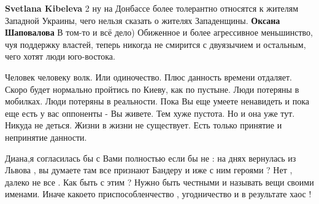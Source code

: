 \begin{itemize}
\begin{itemize}
\textbf{Svetlana Kibeleva} 2 ну на Донбассе более толерантно относятся к
жителям Западной Украины, чего нельзя сказать о жителях Западенщины.
\textbf{Оксана Шаповалова}
В том-то и всё дело)
Обиженное и более агрессивное меньшинство, чуя поддержку властей, теперь никогда не смирится с двуязычием и остальным, чего хотят люди юго-востока.
\end{itemize}
 
Человек человеку волк. Или одиночество. Плюс данность времени отдаляет. Скоро
будет нормально пройтись по Киеву, как по пустыне. Люди потеряны в мобилках.
Люди потеряны в реальности. Пока Вы еще умеете ненавидеть и пока еще есть у вас
оппоненты - Вы живете. Тем хуже пустота. Но и она уже тут. Никуда не деться.
Жизни в жизни не существует. Есть только принятие и непринятие данности.


Диана,я согласилась бы с Вами полностью если бы не : на днях вернулась из
Львова , вы думаете там все признают Бандеру и иже с ним героями ? Нет , далеко
не все . Как быть с этим ? Нужно быть честными и называть вещи своими именами.
Иначе какоето приспособленчество , угодничество и в результате хаос !



\end{itemize}
